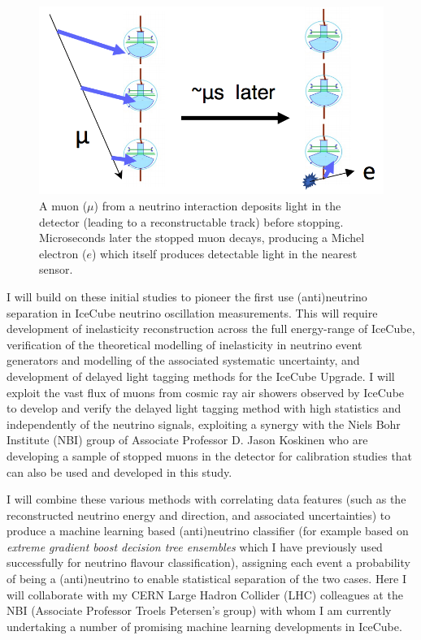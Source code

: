 \documentclass[a4paper,11pt]{article}
\begin{document}
\begin{figure} %
    \centering
    \includegraphics[trim=0.0cm 0.0cm 0.0cm 0.0cm, clip=true, width=\linewidth]{images/michel_electron.png}
    \caption{A muon ($\mu$) from a neutrino interaction deposits light in the detector (leading to a reconstructable track) before stopping. Microseconds later the stopped muon decays, producing a Michel electron ($e$) which itself produces detectable light in the nearest sensor. }
    \label{fig:michel_electron}
\end{figure}

I will build on these initial studies to pioneer the first use (anti)neutrino separation in IceCube neutrino oscillation measurements. This will require development of inelasticity reconstruction across the full energy-range of IceCube, verification of the theoretical modelling of inelasticity in neutrino event generators and modelling of the associated systematic uncertainty, and development of delayed light tagging methods for the IceCube Upgrade. I will exploit the vast flux of muons from cosmic ray air showers observed by IceCube to develop and verify the delayed light tagging method with high statistics and independently of the neutrino signals, exploiting a synergy with the Niels Bohr Institute (NBI) group of Associate Professor D. Jason Koskinen who are developing a sample of stopped muons in the detector for calibration studies that can also be used and developed in this study. 

I will combine these various methods with correlating data features (such as the reconstructed neutrino energy and direction, and associated uncertainties) to produce a machine learning based (anti)neutrino classifier (for example based on \textit{extreme gradient boost decision tree ensembles} which I have previously used successfully for neutrino flavour classification), assigning each event a probability of being a (anti)neutrino to enable statistical separation of the two cases. Here I will collaborate with my CERN Large Hadron Collider (LHC) colleagues at the NBI (Associate Professor Troels Petersen's group) with whom I am currently undertaking a number of promising machine learning developments in IceCube.
\end{document}
